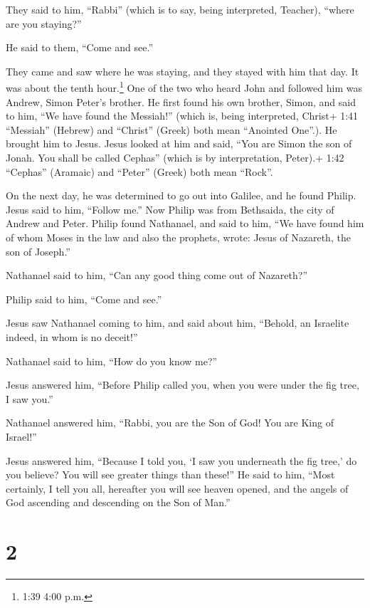 They said to him, ``Rabbi'' (which is to say, being interpreted,
Teacher), ``where are you staying?''

 He said to them, ``Come and see.''

They came and saw where he was staying, and they stayed with him that
day. It was about the tenth hour.\footnote{1:39 4:00 p.m.} 
One of the two who heard John and followed him was Andrew, Simon Peter's
brother.  He first found his own brother, Simon, and said
to him, ``We have found the Messiah!'' (which is, being interpreted,
Christ+ 1:41 ``Messiah'' (Hebrew) and ``Christ'' (Greek) both mean
``Anointed One''.).  He brought him to Jesus. Jesus looked
at him and said, ``You are Simon the son of Jonah. You shall be called
Cephas'' (which is by interpretation, Peter).+ 1:42 ``Cephas'' (Aramaic)
and ``Peter'' (Greek) both mean ``Rock''.

 On the next day, he was determined to go out into Galilee,
and he found Philip. Jesus said to him, ``Follow me.''  Now
Philip was from Bethsaida, the city of Andrew and Peter. 
Philip found Nathanael, and said to him, ``We have found him of whom
Moses in the law and also the prophets, wrote: Jesus of Nazareth, the
son of Joseph.''

 Nathanael said to him, ``Can any good thing come out of
Nazareth?''

Philip said to him, ``Come and see.''

 Jesus saw Nathanael coming to him, and said about him,
``Behold, an Israelite indeed, in whom is no deceit!''

 Nathanael said to him, ``How do you know me?''

Jesus answered him, ``Before Philip called you, when you were under the
fig tree, I saw you.''

 Nathanael answered him, ``Rabbi, you are the Son of God!
You are King of Israel!''

 Jesus answered him, ``Because I told you, `I saw you
underneath the fig tree,' do you believe? You will see greater things
than these!''  He said to him, ``Most certainly, I tell you
all, hereafter you will see heaven opened, and the angels of God
ascending and descending on the Son of Man.''

\hypertarget{section-1}{%
\section{2}\label{section-1}}

